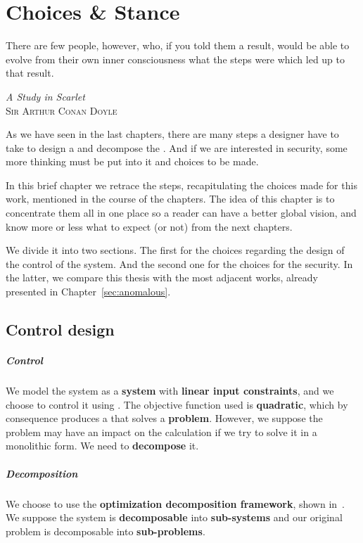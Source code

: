 \documentclass[../main.tex]{subfiles}
\begin{document}
\chapter*{Choices \& Stance}\label{sec:positioning}
\epigraph{\centering There are few people, however, who, if you told them a result, would be able to evolve from their own inner consciousness what the steps were which led up to that result.}
{\textit{A Study in Scarlet}\\ \textsc{Sir Arthur Conan Doyle}}
As we have seen in the last chapters, there are many steps a designer have to take to design a \cps{} and decompose the \mpc{}.
And if we are interested in security, some more thinking must be put into it and choices to be made.

In this brief chapter we retrace the steps, recapitulating the choices made for this work, mentioned in the course of the chapters.
The idea of this chapter is to concentrate them all in one place so a reader can have a better global vision, and know more or less what to expect (or not) from the next chapters.

We divide it into two sections.
The first for the choices regarding the design of the control of the system.
And the second one for the choices for the security.
In the latter, we compare this thesis with the most adjacent works, already presented in Chapter~\ref{sec:anomalous}.

\section*{Control design}
\paragraph*{Control}\label{sec:control_chosen}
We model the system as a \textbf{\ltidt{} system} with \textbf{linear input constraints}, and we choose to control it using \textbf{\mpc{}}.
The objective function used is \textbf{quadratic}, which by consequence produces a \mpc{} that solves a \textbf{\qp{} problem}.
However, we suppose the problem may have an impact on the calculation if we try to solve it in a monolithic form. We need to \textbf{decompose} it.

\paragraph*{Decomposition}\label{sec:decomposition_chosen}
We choose to use the \textbf{optimization decomposition framework}, shown in~\cite{ConejoEtAl2006,BoydEtAl2015}.
We suppose the system is \textbf{decomposable} into \textbf{sub-systems} and our original problem is decomposable into \textbf{sub-problems}.
\end{document}

